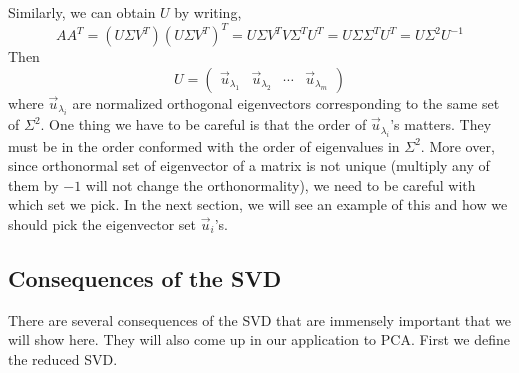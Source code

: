 \documentclass{article}
\begin{document}
Similarly, we can obtain $U$ by writing,
$$AA^T = (U \Sigma V^T)(U \Sigma V^T)^T = U \Sigma V^T V \Sigma^TU^T = U \Sigma  \Sigma^TU^T = U  \Sigma^2U^{-1}$$
Then 
$$U = \begin{pmatrix} \vec{u}_{\lambda_1} & \vec{u}_{\lambda_2} & \cdots & \vec{u}_{\lambda_m} \end{pmatrix}$$ 
where $\vec{u}_{\lambda_i}$ are normalized orthogonal eigenvectors corresponding to the same set of $\Sigma^2$. One thing we have to be careful is that the order of $\vec{u}_{\lambda_i}$'s matters. They must be in the order conformed with the order of eigenvalues in $\Sigma^2$. More over, since orthonormal set of eigenvector of a matrix is not unique (multiply any of them by $-1$ will not change the orthonormality), we need to be careful with which set we pick. In the next section, we will see an example of this and how we should pick the eigenvector set $\vec{u}_i$'s.

\subsection{Consequences of the SVD}
There are several consequences of the SVD that are immensely important that we will show here. They will also come up in our application to PCA. First we define the reduced SVD.
\end{document}
